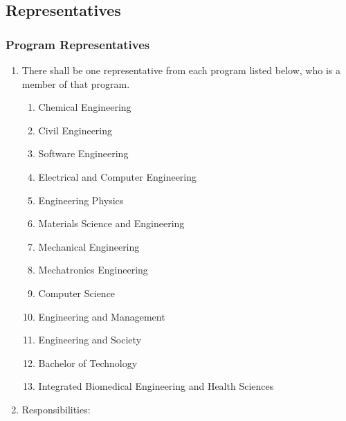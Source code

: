 \subsection{Representatives}
\label{representatives}
\subsubsection{Program
 Representatives}
\label{program-representatives}

\begin{enumerate}
 \item
  There shall be one representative from each program listed below, who is a member of that program.

  \begin{enumerate}
   \item
    Chemical Engineering
   \item
    Civil Engineering
   \item
    Software Engineering
   \item
    Electrical and Computer Engineering
   \item
    Engineering Physics
   \item
    Materials Science and Engineering
   \item
    Mechanical Engineering
   \item
    Mechatronics Engineering
   \item
    Computer Science
   \item
    Engineering and Management
   \item
    Engineering and Society
   \item
    Bachelor of Technology
   \item
    Integrated Biomedical Engineering and Health Sciences
  \end{enumerate}

 \item
  Responsibilities:


\end{enumerate}
